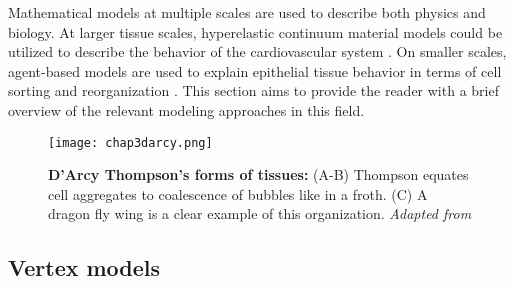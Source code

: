 Mathematical models at multiple scales are used to describe both physics and biology. At larger tissue scales, hyperelastic continuum material models could be utilized to describe the behavior of the cardiovascular system \cite{holzapfel2019}. On smaller scales, agent-based models are used to explain epithelial tissue behavior in terms of cell sorting and reorganization \cite{voss-bohme2012}. This section aims to provide the reader with a brief overview of the relevant modeling approaches in this field.

\begin{figure}
	\centering
	\texttt{[image: chap3darcy.png]}
	\caption{\label{fig_3_6} \textbf{D'Arcy Thompson's forms of tissues:} (A-B) Thompson equates cell aggregates to coalescence of bubbles like in a froth. (C) A dragon fly wing is a clear example of this organization. \textit{Adapted from \cite{thompson1979}}
	}
\end{figure}

\hypertarget{vertex-models}{%
	\subsection{Vertex models}\label{vertex-models}}

